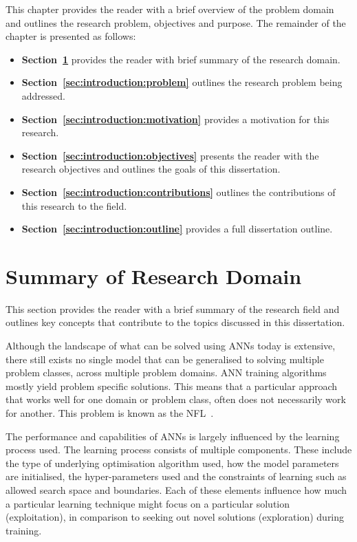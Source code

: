This chapter provides the reader with a brief overview of the problem domain and outlines the research problem, objectives and purpose. The remainder of the chapter is presented as follows:

\begin{itemize}
      \item \textbf{Section~\ref{sec:introduction:summary_research_domain}} provides the reader with brief summary of the research domain.

      \item \textbf{Section~\ref{sec:introduction:problem}} outlines the research problem being addressed.

      \item \textbf{Section~\ref{sec:introduction:motivation}} provides a motivation for this research.

      \item \textbf{Section~\ref{sec:introduction:objectives}} presents the reader with the research objectives and outlines the goals of this dissertation.

      \item \textbf{Section~\ref{sec:introduction:contributions}} outlines the contributions of this research to the field.

      \item \textbf{Section~\ref{sec:introduction:outline}} provides a full dissertation outline.
\end{itemize}


\section{Summary of Research Domain}\label{sec:introduction:summary_research_domain}

This section provides the reader with a brief summary of the research field and outlines key concepts that contribute to the topics discussed in this dissertation.

Although the landscape of what can be solved using \acp{ANN} today is extensive, there still exists no single model that can be generalised to solving multiple problem classes, across multiple problem domains. \acs{ANN} training algorithms mostly yield problem specific solutions. This means that a particular approach that works well for one domain or problem class, often does not necessarily work for another. This problem is known as the \acf{NFL}~\cite{ref:wolpert:1997}.

The performance and capabilities of \acp{ANN} is largely influenced by the learning process used. The learning process consists of multiple components. These include the type of underlying optimisation algorithm used, how the model parameters are initialised, the hyper-parameters used and the constraints of learning such as allowed search space and boundaries. Each of these elements influence how much a particular learning technique might focus on a particular solution (exploitation), in comparison to seeking out novel solutions (exploration) during training.

